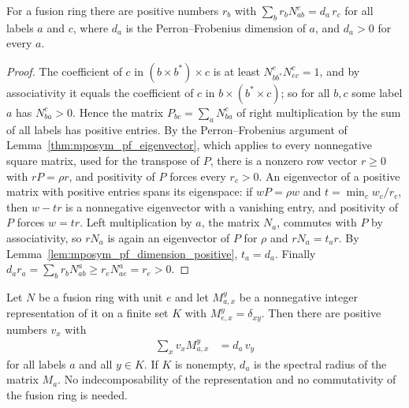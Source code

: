 \begin{lemma}%
    \label{thm:mposym_fusion_ring_regular}
    \leanok
    For a fusion ring there are positive numbers $r_b$ with
    $\sum_br_bN_{ab}^c=d_a\,r_c$ for all labels $a$ and $c$, where $d_a$ is
    the Perron--Frobenius dimension of $a$, and $d_a>0$ for every $a$.
\end{lemma}

\begin{proof}
    \leanok
    The coefficient of $c$ in $(b\times b^*)\times c$ is at least
    $N_{bb^*}^eN_{ec}^c=1$, and by associativity it equals the coefficient
    of $c$ in $b\times(b^*\times c)$; so for all $b,c$ some label $a$ has
    $N_{ba}^c>0$. Hence the matrix $P_{bc}=\sum_aN_{ba}^c$ of right
    multiplication by the sum of all labels has positive entries. By
    the Perron--Frobenius argument of Lemma~\ref{thm:mposym_pf_eigenvector}, which applies to every nonnegative square matrix, used for the transpose of $P$,
    there is a nonzero row vector $r\geq0$ with $rP=\rho r$, and positivity of
    $P$ forces every $r_c>0$. An eigenvector of a positive matrix with
    positive entries spans its eigenspace: if $wP=\rho w$ and $t=\min_c
        w_c/r_c$, then $w-tr$ is a nonnegative eigenvector with a vanishing entry,
    and positivity of $P$ forces $w=tr$. Left multiplication by $a$, the
    matrix $N_a$, commutes with $P$ by associativity, so $rN_a$ is again an
    eigenvector of $P$ for $\rho$ and $rN_a=t_ar$. By
    Lemma~\ref{lem:mposym_pf_dimension_positive}, $t_a=d_a$. Finally
    $d_ar_a=\sum_br_bN_{ab}^a\geq r_eN_{ae}^a=r_e>0$.
\end{proof}

\begin{lemma}%
    \label{thm:mposym_nimrep_pos_eigenvector}
    \leanok
    Let $N$ be a fusion ring with unit $e$ and let $M_{a,x}^y$ be a
    nonnegative integer representation of it on a finite set $K$ with
    $M_{e,x}^y=\delta_{xy}$. Then there are positive numbers $v_x$ with
    \begin{align}
        \sum_xv_xM_{a,x}^y & =d_a\,v_y
        \label{eq:mposym_nimrep_eigenvector}
    \end{align}
    for all labels $a$ and all $y\in K$. If $K$ is nonempty, $d_a$ is the
    spectral radius of the matrix $M_a$. No indecomposability of the
    representation and no commutativity of the fusion ring is needed.
\end{lemma}

